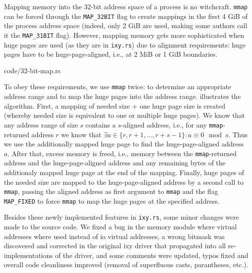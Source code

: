 Mapping memory into the 32-bit address space of a process is no witchcraft.
\texttt{mmap} can be forced through the \texttt{MAP\_32BIT} flag to create
mappings in the first 4 GiB of the process address space (indeed, only 2 GiB are
used, making some authors call it the \texttt{MAP\_31BIT} flag). However,
mapping memory gets more sophisticated when huge pages are used (as they are in
\texttt{ixy.rs}) due to alignment requirements: huge pages have to be
huge-page-aligned, i.e., at 2 MiB or 1 GiB boundaries.

\begin{minipage}{\textwidth}
    
        {code/32-bit-map.rs}
\end{minipage}

To obey these requirements, we use \texttt{mmap} twice: to determine an
appropriate address range and to map the huge pages into the address range.
 illustrates the algorithm. First, a mapping of needed
size + one huge page size is created (whereby needed size is equivalent to one
or multiple huge pages). We know that any address range of size $s$ contains a
$s$-aligned address, i.e., for any \texttt{mmap}-returned address $r$ we know
that ${\exists a \in \{r, r + 1, ..., r + s - 1\}: a \equiv 0 \mod s}$. Thus we
use the additionally mapped huge page to find the huge-page-aligned address $a$.
After that, excess memory is freed, i.e., memory between the
\texttt{mmap}-returned address and the huge-page-aligned address and any
remaining bytes of the additionaly mapped huge page at the end of the mapping.
Finally, huge pages of the needed size are mapped to the huge-page-aligned
address by a second call to \texttt{mmap}, passing the aligned address as first
argument to \texttt{mmap} and the flag \texttt{MAP\_FIXED} to force
\texttt{mmap} to map the huge pages at the specified address.

Besides these newly implemented features in \texttt{ixy.rs}, some minor changes
were made to the source code. We fixed a bug in the memory module where virtual
addresses where used instead of \ac{io} virtual addresses, a wrong bitmask was
discovered and corrected in the original ixy driver \cite{emmerich2019user} that
propagated into all re-implementations \cite{emmerich2019case} of the driver,
and some comments were updated, typos fixed and overall code cleanliness
improved (removal of superfluous casts, parantheses, etc.).



